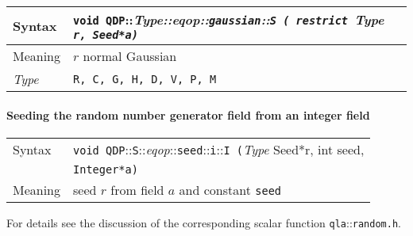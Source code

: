 \documentclass[12pt,letterpaper]{article}
\newcommand{\tInt}{Integer}
\newcommand{\tRandomState}{Seed}
\newcommand{\namespace}{QDP}
\newcommand{\allFloatTypes}{{\tt R, C, G, H, D, V, P, M}}
\newcommand{\ttdash}{{::}}
\newcommand{\itt}{\it Type}
\newcommand{\extraarg}{}
\begin{document}
\begin{flushleft}
  \begin{tabular}{|l|l|}
  \hline
  Syntax      & {\tt void \namespace}\ttdash\itt\ttdash{\it eqop}\ttdash{\tt gaussian}\ttdash{\tt S ( restrict }{\it Type }{\tt *r, \tRandomState *a\extraarg)} \\
  \hline
  Meaning     & $r$ normal Gaussian \\
  \hline
  \itt        & \allFloatTypes \\
  \hline
  \end{tabular}
\end{flushleft}

\paragraph{Seeding the random number generator field from an integer field}

\begin{flushleft}
  \begin{tabular}{|l|l|}
  \hline
  Syntax      & {\tt void \namespace}\ttdash{\tt S}\ttdash{\it eqop}\ttdash{\tt seed}\ttdash{\tt i}\ttdash{\tt I (}{\it Type }{ \tRandomState *r, int seed,}\\
              & {\tt \tInt *a\extraarg)} \\
  \hline
  Meaning     & seed $r$ from field $a$ and constant {\tt seed}\\
  \hline
  \end{tabular}
\end{flushleft}

For details see the discussion of the corresponding scalar function
{\tt qla}\ttdash{\tt random.h}.
\end{document}
